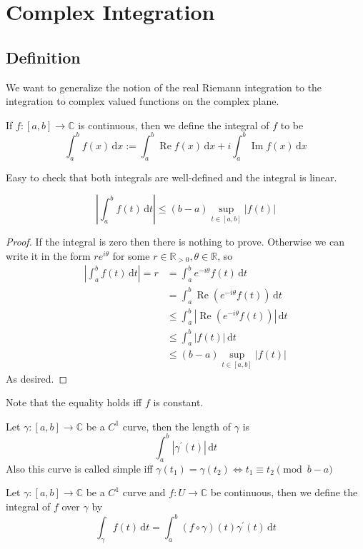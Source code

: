 \section{Complex Integration}
\subsection{Definition}
We want to generalize the notion of the real Riemann integration to the integration to complex valued functions on the complex plane.
\begin{definition}
    If $f:[a,b]\to\mathbb C$ is continuous, then we define the integral of $f$ to be
    $$\int_a^b f(x)\,\mathrm dx :=\int_a^b\operatorname{Re}f(x)\,\mathrm dx+i\int_a^b\operatorname{Im}f(x)\,\mathrm dx$$
\end{definition}
Easy to check that both integrals are well-defined and the integral is linear.
\begin{proposition}
    $$\left|\int_a^bf(t)\,\mathrm dt\right|\le (b-a)\sup_{t\in [a,b]}|f(t)|$$
\end{proposition}
\begin{proof}
    If the integral is zero then there is nothing to prove.
    Otherwise we can write it in the form $re^{i\theta}$ for some $r\in\mathbb R_{>0},\theta\in\mathbb R$, so
    \begin{align*}
        \left|\int_a^bf(t)\,\mathrm dt\right|=r&=\int_a^be^{-i\theta}f(t)\,\mathrm dt\\
        &=\int_a^b\operatorname{Re}(e^{-i\theta}f(t))\,\mathrm dt\\
        &\le \int_a^b|\operatorname{Re}(e^{-i\theta}f(t))|\,\mathrm dt\\
        &\le \int_a^b|f(t)|\,\mathrm dt\\
        &\le (b-a)\sup_{t\in [a,b]}|f(t)|
    \end{align*}
    As desired.
\end{proof}
Note that the equality holds iff $f$ is constant.
\begin{definition}
    Let $\gamma:[a,b]\to\mathbb C$ be a $C^1$ curve, then the length of $\gamma$ is
    $$\int_a^b|\gamma^\prime(t)|\,\mathrm dt$$
    Also this curve is called simple iff $\gamma(t_1)=\gamma(t_2)\iff t_1\equiv t_2\pmod{b-a}$
\end{definition}
\begin{definition}
    Let $\gamma:[a,b]\to\mathbb C$ be a $C^1$ curve and $f:U\to\mathbb C$ be continuous, then we define the integral of $f$ over $\gamma$ by
    $$\int_\gamma f(t)\,\mathrm dt=\int_a^b(f\circ\gamma)(t)\gamma^\prime(t)\,\mathrm dt$$
\end{definition}
